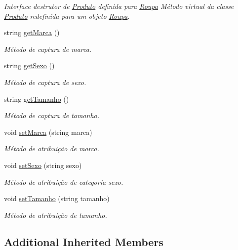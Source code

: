 \begin{DoxyCompactItemize}
\begin{DoxyCompactList}\small\item\em Interface destrutor de \hyperlink{classProduto}{Produto} definida para \hyperlink{classRoupa}{Roupa}  Método virtual da classe \hyperlink{classProduto}{Produto} redefinida para um objeto \hyperlink{classRoupa}{Roupa}. \end{DoxyCompactList}\item 
string \hyperlink{classRoupa_a627cb05c4d7401b97bae9902b6fcbff8}{get\-Marca} ()
\begin{DoxyCompactList}\small\item\em Método de captura de marca. \end{DoxyCompactList}\item 
string \hyperlink{classRoupa_aa9048e6bf54153c4217e75666458f969}{get\-Sexo} ()
\begin{DoxyCompactList}\small\item\em Método de captura de sexo. \end{DoxyCompactList}\item 
string \hyperlink{classRoupa_add2ba0c5b5b10c0d99cd85363ce22960}{get\-Tamanho} ()
\begin{DoxyCompactList}\small\item\em Método de captura de tamanho. \end{DoxyCompactList}\item 
void \hyperlink{classRoupa_a7a5daab180f39dc0f6356f0a029b7174}{set\-Marca} (string marca)
\begin{DoxyCompactList}\small\item\em Método de atribuição de marca. \end{DoxyCompactList}\item 
void \hyperlink{classRoupa_a6cf689693ff15cb33cf258171ccd11db}{set\-Sexo} (string sexo)
\begin{DoxyCompactList}\small\item\em Método de atribuição de categoria sexo. \end{DoxyCompactList}\item 
void \hyperlink{classRoupa_a26a2f97971c92f32b9eb5b3c73d2d825}{set\-Tamanho} (string tamanho)
\begin{DoxyCompactList}\small\item\em Método de atribuição de tamanho. \end{DoxyCompactList}\end{DoxyCompactItemize}
\subsection*{Additional Inherited Members}


